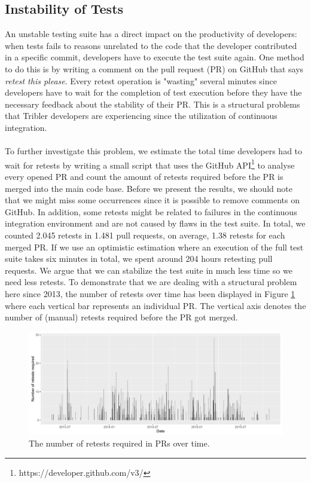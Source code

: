 \subsection{Instability of Tests}
\label{subsec:instability-tests}
An unstable testing suite has a direct impact on the productivity of developers: when tests fails to reasons unrelated to the code that the developer contributed in a specific commit, developers have to execute the test suite again. One method to do this is by writing a comment on the pull request (PR) on GitHub that says \emph{retest this please}. Every retest operation is "wasting" several minutes since developers have to wait for the completion of test execution before they have the necessary feedback about the stability of their PR. This is a structural problems that Tribler developers are experiencing since the utilization of continuous integration.\\\\
To further investigate this problem, we estimate the total time developers had to wait for retests by writing a small script that uses the GitHub API\footnote{https://developer.github.com/v3/} to analyse every opened PR and count the amount of retests required before the PR is merged into the main code base. Before we present the results, we should note that we might miss some occurrences since it is possible to remove comments on GitHub. In addition, some retests might be related to failures in the continuous integration environment and are not caused by flaws in the test suite. In total, we counted 2.045 retests in 1.481 pull requests, on average, 1.38 retests for each merged PR. If we use an optimistic estimation where an execution of the full test suite takes six minutes in total, we spent around 204 hours retesting pull requests. We argue that we can stabilize the test suite in much less time so we need less retests. To demonstrate that we are dealing with a structural problem here since 2013, the number of retests over time has been displayed in Figure \ref{fig:retest-this-please-required} where each vertical bar represents an individual PR. The vertical axis denotes the number of (manual) retests required before the PR got merged.\\

\begin{figure}[h!]
	\centering
	\includegraphics[width=1.0\columnwidth]{images/improving_qa/retests_required}
	\caption{The number of retests required in PRs over time.}
	\label{fig:retest-this-please-required}
\end{figure}

